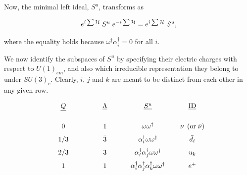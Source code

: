 \documentclass[letterpaper,12pt,titlepage,oneside,final]{book}
\newcommand{\oot}{\omega \omega^{\dagger}}
\newcommand{\spacer}{0.2cm}
\begin{document}
Now, the minimal left ideal, $S^u$, transforms as 

\begin{equation}\label{transfspin}
e^{i\sum\mathcal{H}} \hspace{1mm}S^u \hspace{1mm}e^{-i\sum\mathcal{H}} =e^{i\sum\mathcal{H}} \hspace{1mm}S^u  ,
\end{equation}

\noindent  where the equality holds because $\omega^{\dagger}\alpha_i^{\dagger} = 0$ for all $i$.   

We now identify the subspaces of $S^{u}$ by specifying their electric charges with respect to $U(1)_{em}$, and also which irreducible representation they belong to under $SU(3)_c$.  Clearly, $i$, $j$ and $k$ are meant to be distinct from each other in any given row.  





\begin{equation}\begin{array}{cccc}\label{upcharge}
\hspace{.75cm}\underline{Q}\hspace{.75cm}   &    \hspace{.75cm}\boldmath{\underline{\Lambda}} \hspace{.75cm}&\hspace{.75cm} \underline{S^u} \hspace{.75cm}& \hspace{.75cm}\underline{\textup{ID}} \hspace{.75cm}\vspace{6mm}\\

0 & 1 & \oot & \nu \hspace{1mm} \left(\textup{or}\hspace{1mm} \bar{\nu}\right)   \vspace{\spacer}\\

1/3 & \bar{3} & \alpha_i^{\dagger}\oot & \bar{d}_i  \vspace{\spacer}\\

2/3 & 3 &  \alpha_i^{\dagger}\alpha_j ^{\dagger}\oot & u_k \vspace{\spacer}\\

1 & 1 & \alpha_i^{\dagger}\alpha_j ^{\dagger}\alpha_k^{\dagger}\oot & e^+    \vspace{\spacer}
\end{array}\end{equation}
\end{document}

